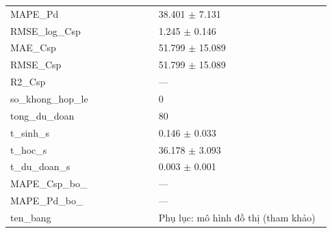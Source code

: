 \begin{longtable}{p{0.43\linewidth}p{0.50\linewidth}}
MAPE\_\allowbreak Pd & 38.401 $\pm$ 7.131 \\
RMSE\_\allowbreak log\_\allowbreak Csp & 1.245 $\pm$ 0.146 \\
MAE\_\allowbreak Csp & 51.799 $\pm$ 15.089 \\
RMSE\_\allowbreak Csp & 51.799 $\pm$ 15.089 \\
R2\_\allowbreak Csp & — \\
so\_\allowbreak khong\_\allowbreak hop\_\allowbreak le & 0 \\
tong\_\allowbreak du\_\allowbreak doan & 80 \\
t\_\allowbreak sinh\_\allowbreak s & 0.146 $\pm$ 0.033 \\
t\_\allowbreak hoc\_\allowbreak s & 36.178 $\pm$ 3.093 \\
t\_\allowbreak du\_\allowbreak doan\_\allowbreak s & 0.003 $\pm$ 0.001 \\
MAPE\_\allowbreak Csp\_\allowbreak bo\_\allowbreak 0075 & — \\
MAPE\_\allowbreak Pd\_\allowbreak bo\_\allowbreak 0075 & — \\
ten\_\allowbreak bang & Phụ lục: mô hình đồ thị (tham khảo) \\
\midrule
\bottomrule
\end{longtable}
